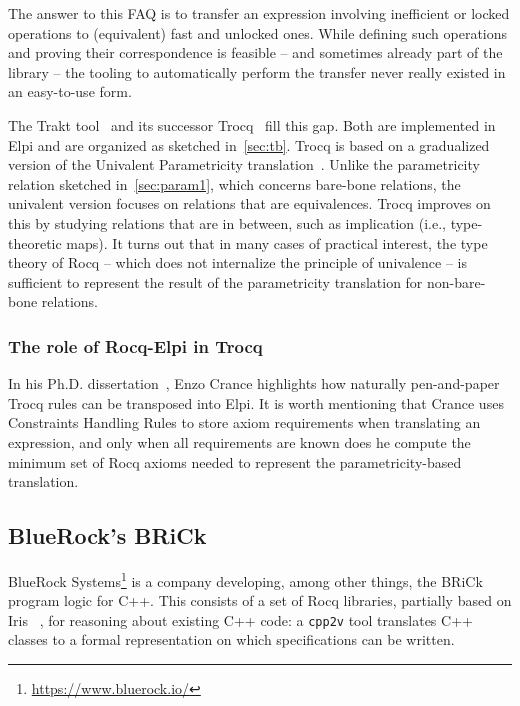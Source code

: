 \documentclass{these-ISSS}
\begin{document}
The answer to this FAQ is to transfer an expression involving inefficient or
locked operations to (equivalent) fast and unlocked ones. While defining such
operations and proving their correspondence is feasible -- and sometimes already
part of the library -- the tooling to automatically perform the transfer never
really existed in an easy-to-use form.

The Trakt tool~\cite{DBLP:conf/cpp/Blot0CPKMV23} and its successor
Trocq~\cite{10.1007/978-3-031-57262-3_10} fill this gap. Both are implemented
in Elpi and are organized as sketched in~\cref{sec:tb}. Trocq is based on a
gradualized version of the Univalent Parametricity
translation~\cite{10.1145/3429979}. Unlike the parametricity relation
sketched in~\cref{sec:param1}, which concerns bare-bone relations, the
univalent version focuses on relations that are equivalences. Trocq improves
on this by studying relations that are in between, such as implication (i.e.,
type-theoretic maps). It turns out that in many cases of practical interest,
the type theory of Rocq -- which does not internalize the principle of
univalence -- is sufficient to represent the result of the parametricity
translation for non-bare-bone relations.

\subsubsection{The role of Rocq-Elpi in Trocq}

In his Ph.D. dissertation~\cite[Page 115]{enzo}, Enzo Crance highlights how naturally
pen-and-paper Trocq rules can be transposed into Elpi. It is worth mentioning
that Crance uses Constraints Handling Rules to store axiom requirements when
translating an expression, and only when all requirements are known does he
compute the minimum set of Rocq axioms needed to represent the
parametricity-based translation.



\subsection{BlueRock's BRiCk}


BlueRock Systems\footnote{\url{https://www.bluerock.io/}} is a company
developing, among other things, the BRiCk program logic for C++. This consists
of a set of Rocq libraries, partially based on Iris
~\cite{10.1145/2676726.2676980,10.1007/978-3-662-54434-1_26}, for reasoning
about existing C++ code: a \texttt{cpp2v} tool translates C++ classes to a
formal representation on which specifications can be written.
\end{document}
